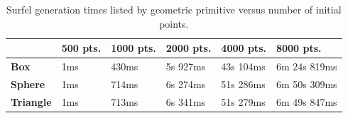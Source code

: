 \vfill
\begin{table}[h!]
   \centering
   \begin{tabular}{ | l | l | l | l | l | l | }
   \hline
   & \textbf{500 pts.} & \textbf{1000 pts.} & \textbf{2000 pts.} & \textbf{4000 pts.} & \textbf{8000 pts.} \\ \hline
   \textbf{Box} & 1ms & 430ms & 5s 927ms & 43s 104ms & 6m 24s 819ms \\ \hline
   \textbf{Sphere} & 1ms & 714ms & 6s 274ms & 51s 286ms & 6m 50s 309ms \\ \hline
   \textbf{Triangle} & 1ms & 713ms & 6s 341ms & 51s 279ms & 6m 49s 847ms \\ \hline
   \end{tabular}
   \captionfonts
   \caption[Surfel generation times]{Surfel generation times listed by geometric primitive versus number of initial points.}
   \label{tbl:surf_gen_times}
\end{table}
\vfill
                        
